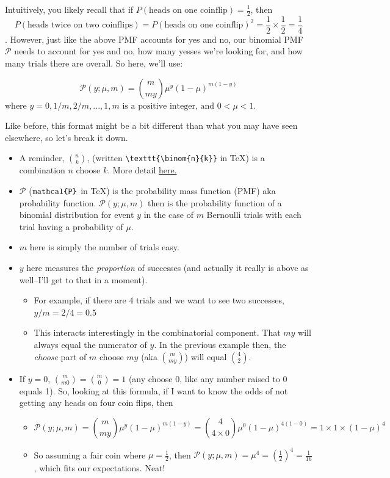 \documentclass[
]{book}
\providecommand{\tightlist}{%
  \setlength{\itemsep}{0pt}\setlength{\parskip}{0pt}}
\begin{document}
Intuitively, you likely recall that if \(P(\textrm{heads on one coinflip})=\frac{1}{2}\), then \[P(\textrm{heads twice on two coinflips})=P(\textrm{heads on one coinflip})^2=\frac{1}{2}\times\frac{1}{2}=\frac{1}{4}\]. However, just like the above PMF accounts for yes and no, our binomial PMF \(\mathcal{P}\) needs to account for yes and no, how many yesses we're looking for, and how many trials there are overall. So here, we'll use:

\[\mathcal{P}(y;\mu,m)=\binom{m}{my}\mu^y(1-\mu)^{m(1-y)}\]
where \(y={0, 1/m, 2/m, ..., 1}, m \textrm{ is a positive integer, and }0<\mu<1.\)

Like before, this format might be a bit different than what you may have seen elsewhere, so let's break it down.

\begin{itemize}
\tightlist
\item
  A reminder, \(\binom{n}{k}\), (written \texttt{\textbackslash{}texttt\{\textbackslash{}binom\{n\}\{k\}\}} in TeX) is a combination \(n\) choose \(k\). More detail \href{https://en.wikipedia.org/wiki/Combination}{here.}
\item
  \(\mathcal{P}\) (\(\texttt{\\mathcal\{P\}}\) in TeX) is the probability mass function (PMF) aka probability function. \(\mathcal{P}(y;\mu,m)\) then is the probability function of a binomial distribution for event \(y\) in the case of \(m\) Bernoulli trials with each trial having a probability of \(\mu\).
\item
  \(m\) here is simply the number of trials easy.
\item
  \(y\) here measures the \emph{proportion} of successes (and actually it really is above as well--I'll get to that in a moment).

  \begin{itemize}
  \tightlist
  \item
    For example, if there are 4 trials and we want to see two successes, \(y/m=2/4=0.5\)
  \item
    This interacts interestingly in the combinatorial component. That \(my\) will always equal the numerator of \(y\). In the previous example then, the \emph{choose} part of \(m\) choose \(my\) (aka \(\binom{m}{my}\)) will equal \(\binom{4}{2}\).
  \end{itemize}
\item
  If \(y=0\), \(\binom{m}{m0}=\binom{m}{0}=1\) (any choose 0, like any number raised to 0 equals 1). So, looking at this formula, if I want to know the odds of not getting any heads on four coin flips, then

  \begin{itemize}
  \tightlist
  \item
    \[\mathcal{P}(y;\mu,m)=\binom{m}{my}\mu^y(1-\mu)^{m(1-y)}=\binom{4}{4\times0}\mu^0(1-\mu)^{4(1-0)}=1\times1\times(1-\mu)^4\]
  \item
    So assuming a fair coin where \(\mu=\frac{1}{2}\), then \(\mathcal{P}(y;\mu,m)=\mu^4=(\frac{1}{2})^4=\frac{1}{16}\), which fits our expectations. Neat!
  \end{itemize}
\end{itemize}
\end{document}
